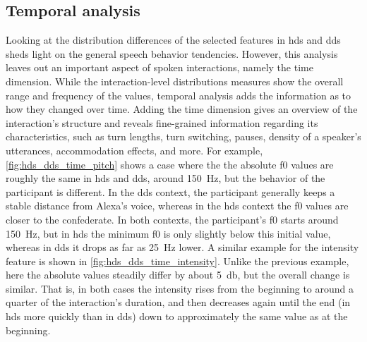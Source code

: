 \subsection{Temporal analysis}
\label{subsec:temporal_analysis}

Looking at the distribution differences of the selected features in \ac{hds} and \ac{dds} sheds light on the general speech behavior tendencies.
However, this analysis leaves out an important aspect of spoken interactions, namely the time dimension.
While the interaction-level distributions measures show the overall range and frequency of the values, temporal analysis adds the information as to how they changed over time.
Adding the time dimension gives an overview of the interaction's structure and reveals fine-grained information regarding its characteristics, such as turn lengths, turn switching, pauses, density of a speaker's utterances, accommodation effects, and more.
For example, \cref{fig:hds_dds_time_pitch} shows a case where the the absolute \ac{f0} values are roughly the same in \ac{hds} and \ac{dds}, around \SI{150}{\hertz}, but the behavior of the participant is different.
In the \ac{dds} context, the participant generally keeps a stable distance from Alexa's voice, whereas in the \ac{hds} context the \ac{f0} values are closer to the confederate.
In both contexts, the participant's \ac{f0} starts around \SI{150}{\hertz}, but in \ac{hds} the minimum \ac{f0} is only slightly below this initial value, whereas in \ac{dds} it drops as far as \SI{25}{\hertz} lower.
A similar example for the intensity feature is shown in \cref{fig:hds_dds_time_intensity}.
Unlike the previous example, here the absolute values steadily differ by about \SI{5}{\decibel}, but the overall change is similar.
That is, in both cases the intensity rises from the beginning to around a quarter of the interaction's duration, and then decreases again until the end (in \ac{hds} more quickly than in \ac{dds}) down to approximately the same value as at the beginning.

